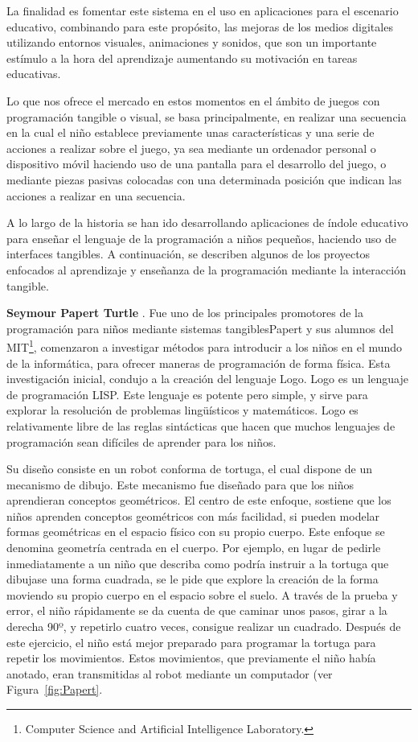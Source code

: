 La finalidad es fomentar este sistema en el uso en aplicaciones para el escenario educativo, combinando para este propósito, las mejoras de los medios digitales utilizando entornos visuales, animaciones y sonidos, que son un importante estímulo a la hora del aprendizaje aumentando su motivación en tareas educativas.

Lo que nos ofrece el mercado en estos momentos en el ámbito de juegos con programación tangible o visual, se basa principalmente, en realizar una secuencia en la cual el niño establece previamente unas características y una serie de acciones a realizar sobre el juego, ya sea mediante un ordenador personal o dispositivo móvil haciendo uso de una pantalla para el desarrollo del juego, o mediante piezas pasivas colocadas con una determinada posición que indican las acciones a realizar en una secuencia.

A lo largo de la historia se han ido desarrollando aplicaciones de índole educativo para enseñar el lenguaje de la programación a niños pequeños, haciendo uso de interfaces tangibles. A continuación, se describen algunos de los proyectos enfocados al aprendizaje y enseñanza de la programación mediante la interacción tangible.

\textbf{Seymour Papert Turtle} \cite{Papert}. Fue uno de los principales promotores de la programación para niños mediante sistemas tangiblesPapert y sus alumnos del MIT\footnote{Computer Science and Artificial Intelligence Laboratory.}, comenzaron a investigar métodos para introducir a los niños en el mundo de la informática, para ofrecer maneras de programación de forma física. Esta investigación inicial, condujo a la creación del lenguaje Logo. Logo es un lenguaje de programación LISP. Este lenguaje es potente pero simple, y sirve para explorar la resolución de problemas lingüísticos y matemáticos. Logo es relativamente libre de las reglas sintácticas que hacen que muchos lenguajes de programación sean difíciles de aprender para los niños.

Su diseño consiste en un robot conforma de tortuga, el cual dispone de un mecanismo de dibujo. Este mecanismo fue diseñado para que los niños aprendieran conceptos geométricos. 
El centro de este enfoque, sostiene que los niños aprenden conceptos geométricos con más facilidad, si pueden modelar formas geométricas en el espacio físico con su propio cuerpo. Este enfoque se denomina geometría centrada en el cuerpo. Por ejemplo, en lugar de pedirle inmediatamente a un niño que describa como podría instruir a la tortuga que dibujase una forma cuadrada, se le pide que explore la creación de la forma moviendo su propio cuerpo en el espacio sobre el suelo. A través de la prueba y error, el niño rápidamente se da cuenta de que caminar unos pasos, girar a la derecha 90º, y repetirlo cuatro veces, consigue realizar un cuadrado. Después de este ejercicio, el niño está mejor preparado para programar la tortuga para repetir los movimientos. Estos movimientos, que previamente el niño había anotado, eran transmitidas al robot mediante un computador (ver Figura~\ref{fig:Papert}.

